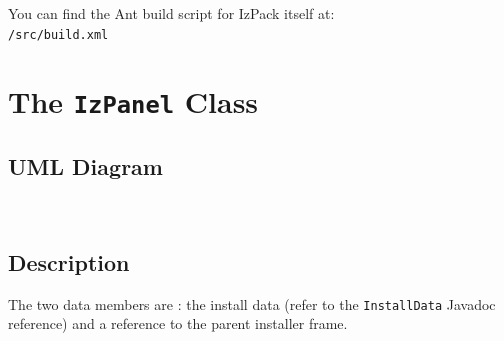 You can find the Ant build script for IzPack itself at:\\

\texttt{/src/build.xml}\\

\section{The \texttt{IzPanel} Class}

\subsection{UML Diagram}

\begin{center}
\end{center}\

\subsection{Description}

The two data members are : the install data (refer to the \texttt{InstallData}
Javadoc reference) and a reference to the parent installer frame.\\

